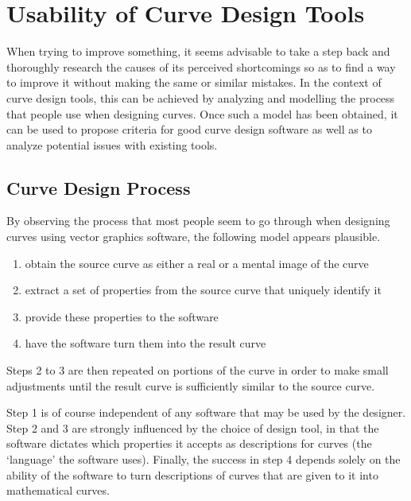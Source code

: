 \documentclass[a4paper]{article}
\begin{document}

	\section{Usability of Curve Design Tools}

		When trying to improve something, it seems advisable to take a step back and thoroughly research the causes of its perceived shortcomings so as to find a way to improve it without making the same or similar mistakes. In the context of curve design tools, this can be achieved by analyzing and modelling the process that people use when designing curves. Once such a model has been obtained, it can be used to propose criteria for good curve design software as well as to analyze potential issues with existing tools.

		\subsection{Curve Design Process}
		\label{section:CurveDesignProcess}

			By observing the process that most people seem to go through when designing curves using vector graphics software, the following model appears plausible.

			\begin{enumerate}
				\item obtain the source curve as either a real or a mental image of the curve
				\item extract a set of properties from the source curve that uniquely identify it
				\item provide these properties to the software
				\item have the software turn them into the result curve
			\end{enumerate}

			Steps 2 to 3 are then repeated on portions of the curve in order to make small adjustments until the result curve is sufficiently similar to the source curve.

			Step 1 is of course independent of any software that may be used by the designer. Step 2 and 3 are strongly influenced by the choice of design tool, in that the software dictates which properties it accepts as descriptions for curves (the `language' the software uses). Finally, the success in step 4 depends solely on the ability of the software to turn descriptions of curves that are given to it into mathematical curves.
\end{document}
